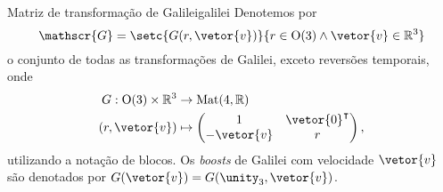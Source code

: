 \begin{definition}{Matriz de transformação de Galilei}{galilei}
    Denotemos por
    \begin{equation*}
        \mathscr{G} = \setc{G(r, \vetor{v})}{r \in \mathrm{O}(3) \land \vetor{v} \in \mathbb{R}^3}
    \end{equation*}
    o conjunto de todas as transformações de Galilei, exceto reversões temporais, onde
    \begin{align*}
        G : \mathrm{O}(3) \times \mathbb{R}^3 &\to \mathrm{Mat}(4, \mathbb{R})\\
                       (r,\vetor{v}) &\mapsto \begin{pmatrix}
                           1 & \vetor{0}^\intercal\\
                           -\vetor{v} & r
                       \end{pmatrix},
    \end{align*}
    utilizando a notação de blocos. Os \emph{boosts} de Galilei com velocidade \(\vetor{v}\) são denotados por \(G(\vetor{v}) = G(\unity_3, \vetor{v})\).
\end{definition}

